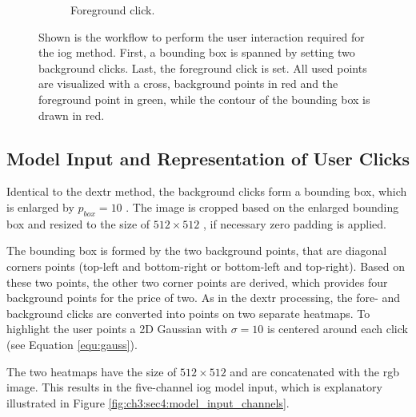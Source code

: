 \begin{figure}
\begin{subfigure}[b]{0.3\textwidth}
		\caption{Foreground click.}
		\label{fig:ch3:sec4:iog_workflow_3}
	\end{subfigure}
	\caption[IOG User Interaction]{
		Shown is the workflow to perform the user interaction required for the \gls{iog} method.
		First, a bounding box is spanned by setting two background clicks.
		Last, the foreground click is set.
		All used points are visualized with a cross, background points in red and the foreground point in green, while the contour of the bounding box is drawn in red.
	} 
	\label{fig:ch3:sec4:iog_user_clicks}
\end{figure}

\subsection{Model Input and Representation of User Clicks}\label{ord:ch3:sec4:subsec2}

Identical to the \gls{dextr} method, the background clicks form a bounding box, which is enlarged by  $p_{{box}} = 10 $ .
The image is cropped based on the enlarged bounding box and resized to the size of $512 \times 512$ , if necessary zero padding is applied.

The bounding box is formed by the two background points, that are diagonal corners points (top-left and bottom-right or bottom-left and top-right).
Based on these two points, the other two corner points are derived, which provides four background points for the price of two.
As in the \gls{dextr} processing, the fore- and background clicks are converted into points on two separate heatmaps.
To highlight the user points a 2D Gaussian with $ \sigma = 10 $ is centered around each click (see Equation \ref{equ:gauss}).

The two heatmaps have the size of $512 \times 512$  and are concatenated with the \Gls{rgb} image.
This results in the five-channel \gls{iog} model input, which is explanatory illustrated in Figure \ref{fig:ch3:sec4:model_input_channels}.

